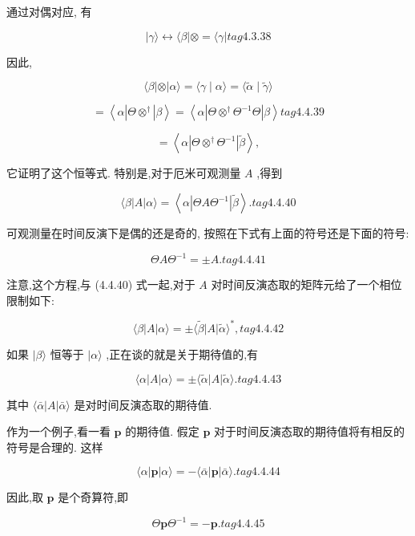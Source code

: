 通过对偶对应, 有

$$
\left| {\gamma \rangle \leftrightarrow \langle \beta }\right| \otimes = \langle \gamma | tag{4. 3.38}
$$

因此,

$$
\langle \beta \left| \otimes \right| \alpha \rangle = \langle \gamma \mid \alpha \rangle = \langle \widetilde{\alpha } \mid \widetilde{\gamma }\rangle
$$

$$
= \left\langle {\alpha \left| {\Theta { \otimes }^{ \dagger }}\right| \beta }\right\rangle = \left\langle {\alpha \left| {\Theta { \otimes }^{ \dagger }{\Theta }^{-1}\Theta }\right| \beta }\right\rangle tag{4. 4.39}
$$

$$
= \left\langle {\alpha \left| {\Theta { \otimes }^{ \dagger }{\Theta }^{-1}}\right| \widetilde{\beta }}\right\rangle ,
$$

它证明了这个恒等式. 特别是,对于厄米可观测量 $A$ ,得到

$$
\langle \beta \left| A\right| \alpha \rangle = \left\langle {\alpha \left| {{\Theta A}{\Theta }^{-1}}\right| \widetilde{\beta }}\right\rangle . tag{4.4.40}
$$

可观测量在时间反演下是偶的还是奇的, 按照在下式有上面的符号还是下面的符号:

$$
{\Theta A}{\Theta }^{-1} = \pm A. tag{4.4.41}
$$

注意,这个方程,与 (4.4.40) 式一起,对于 $A$ 对时间反演态取的矩阵元给了一个相位限制如下:

$$
\langle \beta \left| A\right| \alpha \rangle = \pm \langle \widetilde{\beta }\left| A\right| \widetilde{\alpha }{\rangle }^{ * }, tag{4.4.42}
$$

如果 $|\beta \rangle$ 恒等于 $|\alpha \rangle$ ,正在谈的就是关于期待值的,有

$$
\langle \alpha \left| A\right| \alpha \rangle = \pm \langle \widetilde{\alpha }\left| A\right| \widetilde{\alpha }\rangle . tag{4. 4.43}
$$

其中 $\langle \bar{\alpha }\left| A\right| \bar{\alpha }\rangle$ 是对时间反演态取的期待值.

作为一个例子,看一看 $\mathbf{p}$ 的期待值. 假定 $\mathbf{p}$ 对于时间反演态取的期待值将有相反的符号是合理的. 这样

$$
\langle \alpha \left| \mathbf{p}\right| \alpha \rangle = - \langle \bar{\alpha }\left| \mathbf{p}\right| \bar{\alpha }\rangle . tag{4.4.44}
$$

因此,取 $\mathbf{p}$ 是个奇算符,即

$$
\Theta \mathbf{p}{\Theta }^{-1} = - \mathbf{p}. tag{4.4.45}
$$

